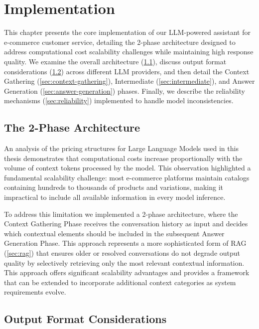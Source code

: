 \chapter{Implementation}
\label{cha:impl}

This chapter presents the core implementation of our LLM-powered assistant for e-commerce customer service, detailing the 2-phase architecture designed to address computational cost scalability challenges while maintaining high response quality.
We examine the overall architecture (\cref{sec:architecture}), discuss output format considerations (\cref{sec:output_format}) across different LLM providers, and then detail the Context Gathering (\cref{sec:context-gathering}), Intermediate (\cref{sec:intermediate}), and Answer Generation (\cref{sec:answer-generation}) phases.
Finally, we describe the reliability mechanisms (\cref{sec:reliability}) implemented to handle model inconsistencies.

\section{The 2-Phase Architecture}
\label{sec:architecture}

An analysis of the pricing structures for Large Language Models used in this thesis \cite{gemini_pricing, anthropic_pricing, openai_pricing} demonstrates that computational costs increase proportionally with the volume of context tokens processed by the model.
This observation highlighted a fundamental scalability challenge: most e-commerce platforms maintain catalogs containing hundreds to thousands of products and variations, making it impractical to include all available information in every model inference.

To address this limitation we implemented a 2-phase architecture, where the Context Gathering Phase receives the conversation history as input and decides which contextual elements should be included in the subsequent Answer Generation Phase.
This approach represents a more sophisticated form of RAG (\cref{sec:rag}) that ensures older or resolved conversations do not degrade output quality by selectively retrieving only the most relevant contextual information.
This approach offers significant scalability advantages and provides a framework that can be extended to incorporate additional context categories as system requirements evolve.

\section{Output Format Considerations}
\label{sec:output_format}


